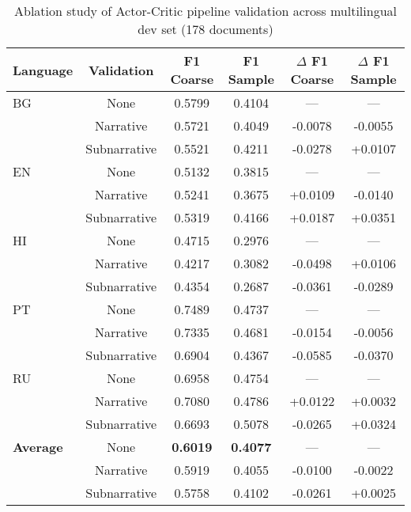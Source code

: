 \begin{table*}[ht]
\centering
\caption{Ablation study of Actor-Critic pipeline validation across multilingual dev set (178 documents)%
}
\label{tab:actor_critique_ablation}
\small
\begin{tabular}{lccccc}
\hline
\textbf{Language} & \textbf{Validation} & \textbf{F1 Coarse} & \textbf{F1 Sample} & \textbf{$\Delta$ F1 Coarse} & \textbf{$\Delta$ F1 Sample} \\
\hline
BG & None & 0.5799 & 0.4104 & --- & --- \\
   & Narrative & 0.5721 & 0.4049 & -0.0078 & -0.0055 \\
   & Subnarrative & 0.5521 & 0.4211 & -0.0278 & +0.0107 \\
\hline
EN & None & 0.5132 & 0.3815 & --- & --- \\
   & Narrative & 0.5241 & 0.3675 & +0.0109 & -0.0140 \\
   & Subnarrative & 0.5319 & 0.4166 & +0.0187 & +0.0351 \\
\hline
HI & None & 0.4715 & 0.2976 & --- & --- \\
   & Narrative & 0.4217 & 0.3082 & -0.0498 & +0.0106 \\
   & Subnarrative & 0.4354 & 0.2687 & -0.0361 & -0.0289 \\
\hline
PT & None & 0.7489 & 0.4737 & --- & --- \\
   & Narrative & 0.7335 & 0.4681 & -0.0154 & -0.0056 \\
   & Subnarrative & 0.6904 & 0.4367 & -0.0585 & -0.0370 \\
\hline
RU & None & 0.6958 & 0.4754 & --- & --- \\
   & Narrative & 0.7080 & 0.4786 & +0.0122 & +0.0032 \\
   & Subnarrative & 0.6693 & 0.5078 & -0.0265 & +0.0324 \\
\hline
\textbf{Average} & None & \textbf{0.6019} & \textbf{0.4077} & --- & --- \\
                 & Narrative & 0.5919 & 0.4055 & -0.0100 & -0.0022 \\
                 & Subnarrative & 0.5758 & 0.4102 & -0.0261 & +0.0025 \\
\hline
\end{tabular}
\end{table*}

